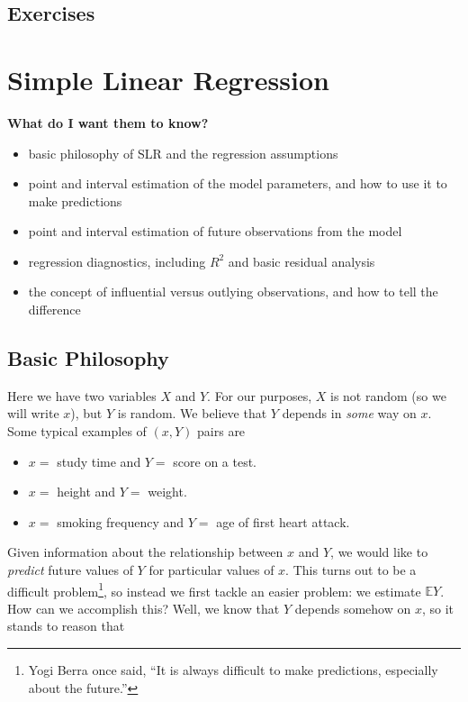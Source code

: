 \documentclass[]{book}
\providecommand{\tightlist}{%
  \setlength{\itemsep}{0pt}\setlength{\parskip}{0pt}}
\let\rmarkdownfootnote\footnote%
\def\footnote{\protect\rmarkdownfootnote}
\numberwithin{equation}{chapter}
\numberwithin{figure}{chapter}
\theoremstyle{plain}
\theoremstyle{definition}
\theoremstyle{remark}
\theoremstyle{definition}
\theoremstyle{definition}
\theoremstyle{remark}
\begin{document}
\section{Exercises}\label{exercises-7}

\chapter{Simple Linear Regression}\label{cha-simple-linear-regression}

\textbf{What do I want them to know?}

\begin{itemize}
\tightlist
\item
  basic philosophy of SLR and the regression assumptions
\item
  point and interval estimation of the model parameters, and how to use
  it to make predictions
\item
  point and interval estimation of future observations from the model
\item
  regression diagnostics, including \(R^{2}\) and basic residual
  analysis
\item
  the concept of influential versus outlying observations, and how to
  tell the difference
\end{itemize}

\section{Basic Philosophy}\label{sec-basic-philosophy}

Here we have two variables \(X\) and \(Y\). For our purposes, \(X\) is
not random (so we will write \(x\)), but \(Y\) is random. We believe
that \(Y\) depends in \emph{some} way on \(x\). Some typical examples of
\((x,Y)\) pairs are

\begin{itemize}
\tightlist
\item
  \(x =\) study time and \(Y =\) score on a test.
\item
  \(x =\) height and \(Y =\) weight.
\item
  \(x =\) smoking frequency and \(Y =\) age of first heart attack.
\end{itemize}

Given information about the relationship between \(x\) and \(Y\), we
would like to \emph{predict} future values of \(Y\) for particular
values of \(x\). This turns out to be a difficult problem\footnote{Yogi
  Berra once said, ``It is always difficult to make predictions,
  especially about the future.''}, so instead we first tackle an easier
problem: we estimate \(\mathbb{E}Y\). How can we accomplish this? Well,
we know that \(Y\) depends somehow on \(x\), so it stands to reason that
\end{document}
